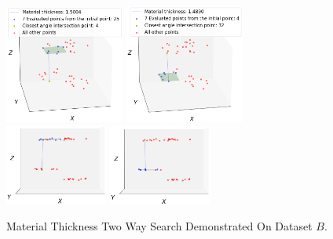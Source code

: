 \documentclass[%
]{USN-MSc}
\begin{document}
\begin{figure}[H]
  \centering
  \includegraphics[width=0.35\textwidth]{fig/Material Thickness Optimal Neighbourhood Step Border Top.png}
  \hspace{0.5cm}
  \includegraphics[width=0.35\textwidth]{fig/Material Thickness Optimal Neighbourhood Step Border Bottom.png}
  \includegraphics[width=0.30\textwidth]{fig/Material Thickness Optimal Neighbourhood Step Border Top 2.png}
  \hspace{1.15cm}
  \includegraphics[width=0.30\textwidth]{fig/Material Thickness Optimal Neighbourhood Step Border Bottom 2.png}
  
  \caption{Material Thickness Two Way Search Demonstrated On Dataset \(B\).}
  \label{fig:Material Thickness Two Way Search Demonstrated on Dataset B}
\end{figure}
\end{document}
